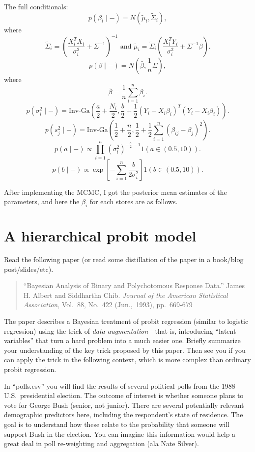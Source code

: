 \documentclass[11pt]{article}
\begin{document}
The full conditionals:
$$p(\beta_i \mid -) = N(\tilde{\mu}_i, \tilde{\Sigma}_i),$$
where $$\tilde{\Sigma}_i = \left( \frac{X_i^TX_i}{\sigma_i^2} + \Sigma^{-1} \right)^{-1} \text{ and } \tilde{\mu}_i = \tilde{\Sigma}_i \left( \frac{X_i^TY_i}{\sigma_i^2} + \Sigma^{-1}\beta \right).$$
$$p(\beta \mid - ) = N(\bar{\beta}, \frac{1}n \Sigma),$$
where $$\bar{\beta} = \frac{1}n \sum_{i=1}^n \beta_i.$$
$$p(\sigma_i^2 \mid -) = \text{Inv-Ga}(\frac{a}2 + \frac{N_i}2, \frac{b}2 + \frac{1}2(Y_i - X_i\beta_i)^T(Y_i - X_i\beta_i)).$$
$$p(s_j^2 \mid -) = \text{Inv-Ga}(\frac{1}2 + \frac{n}2, \frac{1}2 + \frac{1}2\sum_{i=1}^n (\beta_{ij}-\beta_j)^2).$$
$$p(a \mid -) \propto \prod_{i=1}^n (\sigma^2_i)^{-\frac{a}2 -1} 1(a \in (0.5,10)).$$
$$p(b \mid -) \propto \exp[- \sum_{i=1}^n \frac{b}{2\sigma_i^2}] 1(b \in (0.5,10)).$$

After implementing the MCMC, I got the posterior mean estimates of the parameters, and here the $\beta_i$ for each stores are as follows.


\section{A hierarchical probit model}

Read the following paper (or read some distillation of the paper in a book/blog post/slides/etc).  
\begin{quotation}
``Bayesian Analysis of Binary and Polychotomous Response Data.''  James H. Albert and Siddhartha Chib.  \textit{Journal of the American Statistical Association}, Vol.~88, No.~422 (Jun.,~1993), pp.~669-679
\end{quotation}

The paper describes a Bayesian treatment of probit regression (similar to logistic regression) using the trick of \textit{data augmentation}---that is, introducing ``latent variables'' that turn a hard problem into a much easier one.  Briefly summarize your understanding of the key trick proposed by this paper.  Then see you if you can apply the trick in the following context, which is more complex than ordinary probit regression.

In ``polls.csv'' you will find the results of several political polls from the 1988 U.S.~presidential election.  The outcome of interest is whether someone plans to vote for George Bush (senior, not junior).  There are several potentially relevant demographic predictors here, including the respondent's state of residence.  The goal is to understand how these relate to the probability that someone will support Bush in the election.  You can imagine this information would help a great deal in poll re-weighting and aggregation (ala Nate Silver).
\end{document}
